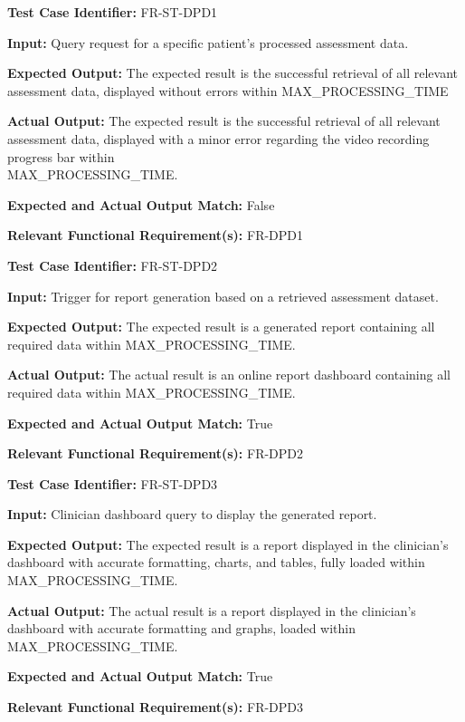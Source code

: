 \documentclass[12pt, titlepage]{article}
\begin{document}
\begin{mdframed}[linewidth=0.5mm] \par
  \textbf{Test Case Identifier:} FR-ST-DPD1 \par
  \textbf{Input:} Query request for a specific patient’s processed assessment data. \par
  \textbf{Expected Output:} The expected result is the successful retrieval of all relevant assessment data, displayed without errors within MAX\_PROCESSING\_TIME \par
  \textbf{Actual Output:} The expected result is the successful retrieval of all relevant assessment data, displayed with a minor error regarding the video recording progress bar within \\MAX\_PROCESSING\_TIME.  \par
  \textbf{Expected and Actual Output Match:} False \par
  \textbf{Relevant Functional Requirement(s):} FR-DPD1
\end{mdframed}

\begin{mdframed}[linewidth=0.5mm] \par
  \textbf{Test Case Identifier:} FR-ST-DPD2 \par
  \textbf{Input:} Trigger for report generation based on a retrieved assessment dataset. \par
  \textbf{Expected Output:} The expected result is a generated report containing all required data within MAX\_PROCESSING\_TIME. \par
  \textbf{Actual Output:} The actual result is an online report dashboard containing all required data within MAX\_PROCESSING\_TIME.  \par
  \textbf{Expected and Actual Output Match:} True \par
  \textbf{Relevant Functional Requirement(s):} FR-DPD2
\end{mdframed}

\begin{mdframed}[linewidth=0.5mm] \par
  \textbf{Test Case Identifier:} FR-ST-DPD3 \par
  \textbf{Input:} Clinician dashboard query to display the generated report. \par
  \textbf{Expected Output:} The expected result is a report displayed in the clinician’s dashboard with accurate formatting, charts, and tables, fully loaded within MAX\_PROCESSING\_TIME. \par
  \textbf{Actual Output:} The actual result is a report displayed in the clinician’s dashboard with accurate formatting and graphs, loaded within \\MAX\_PROCESSING\_TIME. \par
  \textbf{Expected and Actual Output Match:} True \par
  \textbf{Relevant Functional Requirement(s):} FR-DPD3
\end{mdframed}
\end{document}
